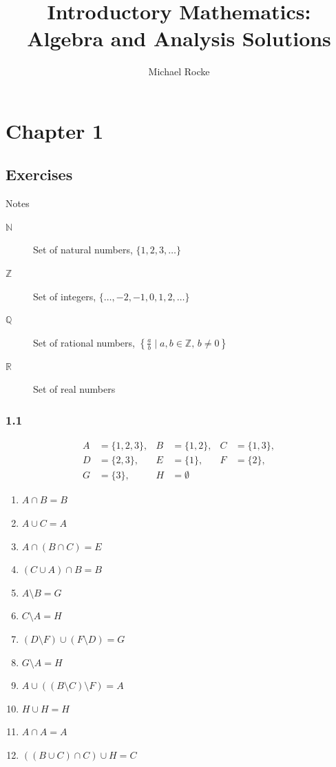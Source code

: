 \documentclass[]{report}
\title{Introductory Mathematics: Algebra and Analysis Solutions}
\author{Michael Rocke}
\begin{document}
\maketitle

\section{Chapter 1}

\subsection{Exercises}
Notes


\begin{description}
  \item[$\mathbb{N}$] Set of natural numbers, $\{1,2,3,\dots\}$
  \item[$\mathbb{Z}$] Set of integers, $\{\dots,-2,-1,0,1,2,\dots\}$
  \item[$\mathbb{Q}$] Set of rational numbers,
    $\left\{\frac{a}{b} \mid a,b \in \mathbb{Z},\, b \ne 0 \right\}$
  \item[$\mathbb{R}$] Set of real numbers
\end{description}


\subsubsection{1.1}
\[
\begin{aligned}
A &= \{1,2,3\}, &
B &= \{1,2\}, &
C &= \{1,3\}, \\
D &= \{2,3\}, &
E &= \{1\}, &
F &= \{2\}, \\
G &= \{3\}, &
H &= \emptyset
\end{aligned}
\]

\begin{enumerate}[label=\alph*)]
  \item $A \cap B = B$
  \item $A \cup C = A$
  \item $A \cap (B \cap C) = E$
  \item $(C \cup A) \cap B = B$
  \item $A \setminus B = G$
\item $ C \setminus A = H $ 
\item $ (D \setminus F) \cup (F \setminus D)  = G$ 
\item $ G \setminus A = H$ 
\item $ A \cup ((B \setminus C) \setminus F)  = A$
\item $ H \cup H = H $
\item $ A \cap A = A $
\item $ ((B \cup C) \cap C) \cup H = C $
\end{enumerate}
\end{document}
